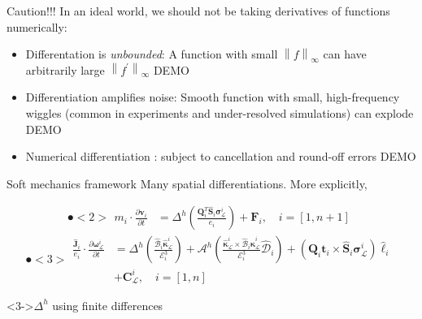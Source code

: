 \documentclass[presentation]{beamer}
\newcommand{\norm}[1]{\left\lVert#1\right\rVert}
\begin{document}
\begin{frame}[label={sec:org03a4fbf}]{Caution!!!}
In an ideal world, we should not be taking derivatives of functions
numerically:
\begin{itemize}
\item Differentation is \emph{unbounded}:
A function with small \(\norm{f}_{\infty}\) can have arbitrarily large \(\norm{f^{\prime}}_{\infty}\) \alert{DEMO}
\item Differentiation amplifies noise:
Smooth function with small, high-frequency wiggles (common in experiments
and under-resolved simulations) can explode \alert{DEMO}
\item Numerical differentiation : subject to cancellation and round-off errors \alert{DEMO}
\end{itemize}
\end{frame}
\begin{frame}[label={sec:orgcc03dff}]{Soft mechanics framework}
Many spatial differentiations. More explicitly,

\[ \spot<2>{\begin{aligned}
   m_i \cdot \frac{\partial \mathbf{v}_i}{\partial t} &= \Delta^h
   \left(\frac{\mathbf{Q}_i^T\hat{\mathbf{S}}_i\boldsymbol{\sigma}^i_{\mathcal{L}}}{e_i}\right)
   +\mathbf{F}_i,\quad i=[1,n+1]
   \end{aligned}} \]
\[ \spot<3>{\begin{aligned}\frac{\hat{\mathbf{J}}_i}{e_i} \cdot \frac{\partial
	\boldsymbol{\omega}^i_{\mathcal{L}}}{\partial t} &=
	\Delta^h\left(\frac{\hat{\boldsymbol{\mathcal{B}}}_i\hat{\boldsymbol{\kappa}}_{\mathcal{L}}^{i}}{\mathcal{E}_i^3}\right) +
	\mathcal{A}^h\left(\frac{\hat{\boldsymbol{\kappa}}_{\mathcal{L}}^i\times\hat{\boldsymbol{\mathcal{B}}}_i
	\hat{\boldsymbol{\kappa}}_{\mathcal{L}}^i}{\mathcal{E}_i^3}
	\hat{\mathcal{D}}_i\right) + \left(\mathbf{Q}_i\mathbf{t}_i\times\hat{\mathbf{S}}_i\boldsymbol{\sigma}^i_{\mathcal{L}}\right)\hat{\ell}_i\\
	&+ \mathbf{C}^i_{\mathcal{L}},\quad i=[1,n] \end{aligned}}\]
\begin{block}<3->{\(\Delta^{h}\) using finite differences}
\end{block}
\end{frame}
\end{document}
